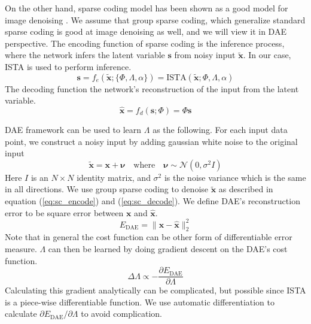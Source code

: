 On the other hand, sparse coding model has been shown as a good model for image denoising \cite{ha99, em06, ob13}. We assume that group sparse coding, which generalize standard sparse coding is good at image denoising as well, and we will view it in DAE perspective. The encoding function of sparse coding is the inference process, where the network infers the latent variable $\boldsymbol{s}$ from noisy input $\tilde{\boldsymbol{x}}$. In our case, ISTA is used to perform inference.
\begin{equation}
\boldsymbol{s}
	= f_e(\tilde{\boldsymbol{x}}; \{\Phi, \Lambda, \alpha\})
	= \text{ISTA}(\tilde{\boldsymbol{x}}; \Phi, \Lambda, \alpha)
\label{eq:sc_encode}
\end{equation}
The decoding function the network's reconstruction of the input from the latent variable.
\begin{equation}
\hat{\boldsymbol{x}}
	= f_d(\boldsymbol{s}; \Phi)
	= \Phi\boldsymbol{s}
\label{eq:sc_decode}
\end{equation}

DAE framework can be used to learn $\Lambda$ as the following. For each input data point, we construct a noisy input by adding gaussian white noise to the original input
\begin{equation}
\tilde{\boldsymbol{x}} = \boldsymbol{x} + \boldsymbol{\nu}
\quad\text{where}\quad
\boldsymbol{\nu} \sim \mathcal{N}(0, \sigma^2 I)
\end{equation}
Here $I$ is an $N\times N$ identity matrix, and $\sigma^2$ is the noise variance which is the same in all directions. We use group sparse coding to denoise $\tilde{\boldsymbol{x}}$ as described in equation (\ref{eq:sc_encode}) and (\ref{eq:sc_decode}). We define DAE's reconstruction error to be square error between $\boldsymbol{x}$ and $\hat{\boldsymbol{x}}$.
\begin{equation}
E_{\text{DAE}} = \|\boldsymbol{x} - \hat{\boldsymbol{x}}\|_2^2
\end{equation}
Note that in general the cost function can be other form of differentiable error measure. $\Lambda$ can then be learned by doing gradient descent on the DAE's cost function.
\begin{equation}
\label{eq:grad_lambda}
\Delta\Lambda \propto
	-\frac{\partial E_{\text{DAE}}}{\partial \Lambda}
\end{equation}
Calculating this gradient analytically can be complicated, but possible since ISTA is a piece-wise differentiable function. We use automatic differentiation to calculate $\partial E_{\text{DAE}} / \partial \Lambda$ to avoid complication.

